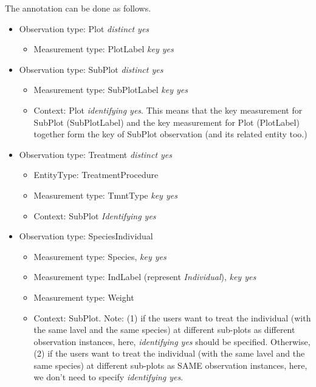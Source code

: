 \documentclass[10pt]{article}
\begin{document}
The annotation can be done as follows. 
\begin{itemize}
\item Observation type: Plot {\em distinct yes}
  \begin{itemize}
  \item Measurement type: PlotLabel {\em key yes}
  \end{itemize}
\item Observation type: SubPlot {\em distinct yes}
  \begin{itemize}
    \item Measurement type: SubPlotLabel {\em key yes}
      \item Context: Plot {\em identifying yes}. This means that the
        key measurement for SubPlot (SubPlotLabel) and the key
        measurement for Plot (PlotLabel) together form the key of
        SubPlot observation (and its related entity too.)
      \end{itemize}
\item Observation type: Treatment {\em distinct yes}
  \begin{itemize}
    \item EntityType: TreatmentProcedure 
    \item Measurement type: TmntType {\em key yes}
   \item Context: SubPlot {\em Identifying yes}
  \end{itemize}
\item Observation type: SpeciesIndividual
  \begin{itemize}
      \item Measurement type: Species, {\em key yes}
      \item Measurement type: IndLabel (represent {\em Individual}), {\em key yes} 
      \item Measurement type: Weight
      \item Context: SubPlot. Note: (1) if the users want to treat the
        individual (with the same lavel and the same species) at
        different sub-plots as different observation instances, here,
        {\em identifying yes} should be specified. Otherwise, (2) if the users want to treat the
        individual (with the same lavel and the same species) at
        different sub-plots as SAME observation instances, here, we
        don't need to specify {\em  identifying yes}.
   \end{itemize} 
\end{itemize}

\end{document}
